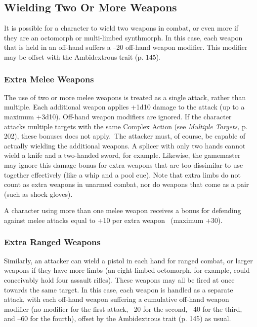 \subsection{Wielding Two Or More Weapons}

It is possible for a character to wield two weapons 
in combat, or even more if they are an octomorph or 
multi-limbed synthmorph. In this case, each weapon 
that is held in an off-hand suffers a –20 off-hand 
weapon modifier. This modifier may be offset with the 
Ambidextrous trait (p. 145).

\subsubsection{Extra Melee Weapons}

The use of two or more melee weapons is treated as 
a single attack, rather than multiple. Each additional 
weapon applies +1d10 damage to the attack (up to 
a maximum +3d10). Off-hand weapon modifiers are 
ignored. If the character attacks multiple targets with 
the same Complex Action (see \textit{Multiple Targets,} p. 
202), these bonuses does not apply. The attacker must, 
of course, be capable of actually wielding the additional
weapons. A splicer with only two hands cannot
wield a knife and a two-handed sword, for example. 
Likewise, the gamemaster may ignore this damage 
bonus for extra weapons that are too dissimilar to 
use together effectively (like a whip and a pool cue). 
Note that extra limbs do not count as extra weapons 
in unarmed combat, nor do weapons that come as a 
pair (such as shock gloves).

A character using more than one melee weapon 
receives a bonus for defending against melee attacks 
equal to +10 per extra weapon  (maximum +30).

\subsubsection{Extra Ranged Weapons}

Similarly, an attacker can wield a pistol in each hand 
for ranged combat, or larger weapons if they have 
more limbs (an eight-limbed octomorph, for example, 
could conceivably hold four assault rifles).  These 
weapons may all be fired at once towards the same 
target. In this case, each weapon is handled as a separate
attack, with each off-hand weapon suffering a
cumulative off-hand weapon modifier (no modifier for 
the first attack, –20 for the second, –40 for the third, 
and –60 for the fourth), offset by the Ambidextrous 
trait (p. 145) as usual.

